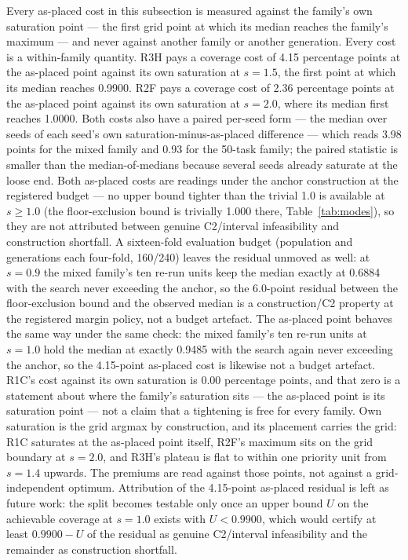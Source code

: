\documentclass[preprint,authoryear]{elsarticle}
\begin{document}
Every as-placed cost in this subsection is measured against the family's own saturation point --- the first grid point at which its median reaches the family's maximum --- and never against another family or another generation. Every cost is a within-family quantity. R3H pays a coverage cost of 4.15 percentage points at the as-placed point against its own saturation at $s=1.5$, the first point at which its median reaches 0.9900. R2F pays a coverage cost of 2.36 percentage points at the as-placed point against its own saturation at $s=2.0$, where its median first reaches 1.0000. Both costs also have a paired per-seed form --- the median over seeds of each seed's own saturation-minus-as-placed difference --- which reads 3.98 points for the mixed family and 0.93 for the 50-task family; the paired statistic is smaller than the median-of-medians because several seeds already saturate at the loose end. Both as-placed costs are readings under the anchor construction at the registered budget --- no upper bound tighter than the trivial 1.0 is available at $s\ge 1.0$ (the floor-exclusion bound is trivially 1.000 there, Table~\ref{tab:modes}), so they are not attributed between genuine C2/interval infeasibility and construction shortfall. A sixteen-fold evaluation budget (population and generations each four-fold, 160/240) leaves the residual unmoved as well: at $s=0.9$ the mixed family's ten re-run units keep the median exactly at 0.6884 with the search never exceeding the anchor, so the 6.0-point residual between the floor-exclusion bound and the observed median is a construction/C2 property at the registered margin policy, not a budget artefact. The as-placed point behaves the same way under the same check: the mixed family's ten re-run units at $s=1.0$ hold the median at exactly 0.9485 with the search again never exceeding the anchor, so the 4.15-point as-placed cost is likewise not a budget artefact. R1C's cost against its own saturation is 0.00 percentage points, and that zero is a statement about where the family's saturation sits --- the as-placed point is its saturation point --- not a claim that a tightening is free for every family. Own saturation is the grid argmax by construction, and its placement carries the grid: R1C saturates at the as-placed point itself, R2F's maximum sits on the grid boundary at $s=2.0$, and R3H's plateau is flat to within one priority unit from $s=1.4$ upwards. The premiums are read against those points, not against a grid-independent optimum. Attribution of the 4.15-point as-placed residual is left as future work: the split becomes testable only once an upper bound $U$ on the achievable coverage at $s=1.0$ exists with $U<0.9900$, which would certify at least $0.9900-U$ of the residual as genuine C2/interval infeasibility and the remainder as construction shortfall.
\end{document}
